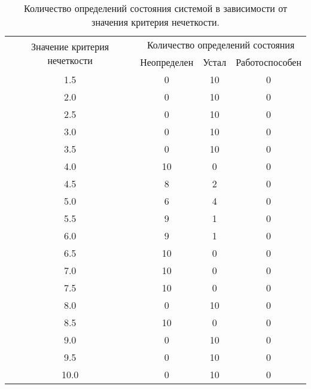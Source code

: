 \begin{table}[H]
	\begin{center}
		\caption{\label{table:time3} Количество определений состояния системой в зависимости от значения критерия нечеткости.}
\begin{tabular}{|c|ccc|}
\hline
\multirow{2}{*}{Значение критерия нечеткости} & \multicolumn{3}{c|}{Количество определений состояния}\\ \cline{2-4} & \multicolumn{1}{c|}{Неопределен} & \multicolumn{1}{c|}{Устал} & Работоспособен \\ \hline
1.5& \multicolumn{1}{c|}{0}            & \multicolumn{1}{c|}{10}    &0 \\ \hline
2.0& \multicolumn{1}{c|}{0}            & \multicolumn{1}{c|}{10}      &0 \\ \hline
2.5& \multicolumn{1}{c|}{0}            & \multicolumn{1}{c|}{10}      &0 \\ \hline
3.0& \multicolumn{1}{c|}{0}            & \multicolumn{1}{c|}{10}      &0 \\ \hline
3.5& \multicolumn{1}{c|}{0}            & \multicolumn{1}{c|}{10}      &0 \\ \hline
4.0& \multicolumn{1}{c|}{10}            & \multicolumn{1}{c|}{0}      &0 \\ \hline
4.5& \multicolumn{1}{c|}{8}            & \multicolumn{1}{c|}{2}      &0 \\ \hline
5.0& \multicolumn{1}{c|}{6}            & \multicolumn{1}{c|}{4}      &0 \\ \hline
5.5& \multicolumn{1}{c|}{9}            & \multicolumn{1}{c|}{1}      &0 \\ \hline
6.0& \multicolumn{1}{c|}{9}            & \multicolumn{1}{c|}{1}      &0 \\ \hline
6.5& \multicolumn{1}{c|}{10}            & \multicolumn{1}{c|}{0}      &0 \\ \hline
7.0& \multicolumn{1}{c|}{10}            & \multicolumn{1}{c|}{0}      &0 \\ \hline
7.5& \multicolumn{1}{c|}{10}            & \multicolumn{1}{c|}{0}      &0 \\ \hline
8.0& \multicolumn{1}{c|}{0}            & \multicolumn{1}{c|}{10}      &0 \\ \hline
8.5& \multicolumn{1}{c|}{10}            & \multicolumn{1}{c|}{0}      &0 \\ \hline
9.0& \multicolumn{1}{c|}{0}            & \multicolumn{1}{c|}{10}      &0 \\ \hline
9.5& \multicolumn{1}{c|}{0}            & \multicolumn{1}{c|}{10}      &0 \\ \hline
10.0& \multicolumn{1}{c|}{0}            & \multicolumn{1}{c|}{10}     &0 \\ \hline
\end{tabular}
	\end{center}
\end{table}

